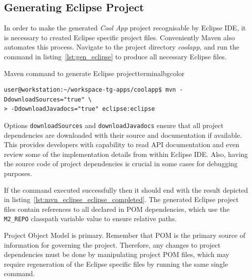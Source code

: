 \subsection{Generating Eclipse Project}

  In order to make the generated \emph{Cool App} project recognisable by Eclipse IDE, it is necessary to created Eclipse specific project files.
  Conveniently Maven also automates this process.
  Navigate to the project directory \emph{coolapp}, and run the command in listing~\ref{lst:gen_eclipse} to produce all necessary Eclipse files.
  
  \begin{code}{Maven command to generate Eclipse project}{\label{lst:gen_eclipse}}{terminalbgcolor}
     \begin{lstlisting}
user@workstation:~/workspace-tg-apps/coolapp$ mvn -DdownloadSources="true" \
> -DdownloadJavadocs="true" eclipse:eclipse
     \end{lstlisting}
  \end{code}
    
  Options \texttt{downloadSources} and \texttt{downloadJavadocs} ensure that all project dependencies are downloaded with their source and documentation if available.
  This provides developers with capability to read API documentation and even review some of the implementation details from within Eclipse IDE.
  Also, having the source code of project dependencies is crucial in some cases for debugging purposes.

  If the command executed successfully then it should end with the result depicted in listing~\ref{lst:mvn_eclipse_eclipse_completed}. 
  The generated Eclipse project files contain references to all declared in POM dependencies, which use the \texttt{M2\_REPO} classpath variable value to ensure relative paths.

  \begin{notebox}{Project Object Model is primary.}{\label{mb:maven_primary}}
    Remember that POM is the primary source of information for governing the project.
    Therefore, any changes to project dependencies must be done by manipulating project POM files, which may require regeneration of the Eclipse specific files by running the same single command.
  \end{notebox}
  
